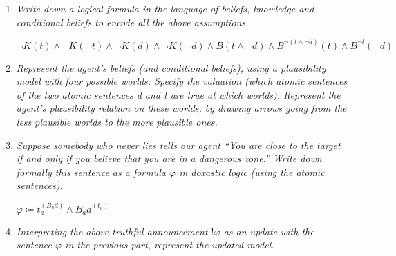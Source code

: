 \documentclass[leqno]{article}
\begin{document}
\begin{enumerate}
    \item \textit{Write down a logical formula in the language of beliefs,
    knowledge and conditional beliefs to encode all the above assumptions.}
    
    $\neg K(t) \land \neg K(\neg t) \land \neg K(d) \land \neg K(\neg d) \land
    B(t \land \neg d) \land B^{\neg (t \land \neg d)}(t) \land 
    B^{\neg t}(\neg d)$

    \item \textit{Represent the agent’s beliefs (and conditional beliefs),
    using a plausibility model with four possible worlds. Specify the valuation
    (which atomic sentences of the two atomic sentences d and t are true at
    which worlds). Represent the agent’s plausibility relation on these worlds,
    by drawing arrows going from the less plausible worlds to the more plausible
    ones.}

    \begin{center}
    \end{center}

    \item \textit{Suppose somebody who never lies tells our agent “You are
    close to the target if and only if you believe that you are in a dangerous
    zone.” Write down formally this sentence as a formula $\varphi$ in doxastic
    logic (using the atomic sentences).}

    $\varphi \coloneqq t_a^{(B_a d)} \wedge B_a d^{(t_a)}$

    \item \textit{Interpreting the above truthful announcement $!\varphi$ as an
    update with the sentence $\varphi$ in the previous part, represent the
    updated model.}


\end{enumerate}
\end{document}
